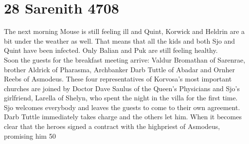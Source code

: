 \section{28 Sarenith 4708}

The next morning Mouse is still feeling ill and Quint, Korwick and Heldrin are a bit under the weather as well. That means that all the kids and both Sjo and Quint have been infected. Only Balian and Puk are still feeling healthy.\\

Soon the guests for the breakfast meeting arrive: Valdur Bromathan of Sarenrae, brother Aldrick of Pharasma, Archbanker Darb Tuttle of Abadar and Ornher Reebs of Asmodeus. These four representatives of Korvosa's most important churches are joined by Doctor Dave Saulus of the Queen's Physicians and Sjo's girlfriend, Larella of Shelyn, who spent the night in the villa for the first time. Sjo welcomes everybody and leaves the guests to come to their own agreement. Darb Tuttle immediately takes charge and the others let him. When it becomes clear that the heroes signed a contract with the highpriest of Asmodeus, promising him 50 %

